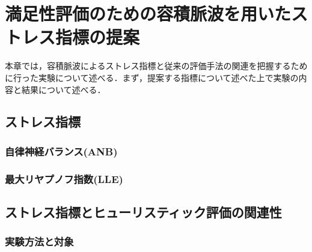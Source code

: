 \chapter{満足性評価のための容積脈波を用いたストレス指標の提案}
\label{chap:pulsewave}

本章では，容積脈波によるストレス指標と従来の評価手法の関連を把握するために行った実験について述べる．まず，提案する指標について述べた上で実験の内容と結果について述べる．

\section{ストレス指標}

\subsection{自律神経バランス(ANB)}

\subsection{最大リヤプノフ指数(LLE)}

\section{ストレス指標とヒューリスティック評価の関連性}

\subsection{実験方法と対象}

